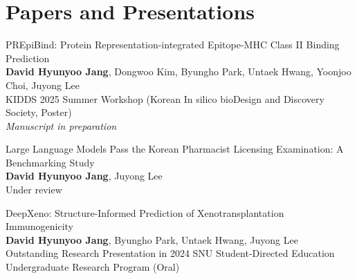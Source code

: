 \documentclass[letterpaper,11pt]{article}
\newenvironment{ieeereflist}{
  \begin{list}{}{
    \setlength{\leftmargin}{2.0em}
    \setlength{\itemindent}{0pt}
    \setlength{\labelwidth}{1.5em}
    \setlength{\labelsep}{0.5em}
    \setlength{\listparindent}{0pt}
    \setlength{\parsep}{0pt}
    \setlength{\topsep}{0pt}
    \setlength{\partopsep}{0pt}
  }
}{
  \end{list}
}
\newcommand{\ieeerefitem}[2]{\item[\small\textbf{[#1]}] \small#2}
\begin{document}
\section{Papers and Presentations}
\begin{ieeereflist}
  \ieeerefitem{1}{PREpiBind: Protein Representation-integrated Epitope-MHC Class II Binding Prediction\\
  \textbf{David Hyunyoo Jang}, Dongwoo Kim, Byungho Park, Untaek Hwang, Yoonjoo Choi, Juyong Lee\\
  KIDDS 2025 Summer Workshop (Korean In silico bioDesign and Discovery Society, Poster)\\
  \textit{Manuscript in preparation}}
  \ieeerefitem{2}{Large Language Models Pass the Korean Pharmacist Licensing Examination: A Benchmarking Study\\
  \textbf{David Hyunyoo Jang}, Juyong Lee\\
  Under review}
  \ieeerefitem{3}{DeepXeno: Structure-Informed Prediction of Xenotransplantation Immunogenicity\\
  \textbf{David Hyunyoo Jang}, Byungho Park, Untaek Hwang, Juyong Lee\\
  Outstanding Research Presentation in 2024 SNU Student-Directed Education Undergraduate Research Program (Oral)}
\end{ieeereflist}
\end{document}
